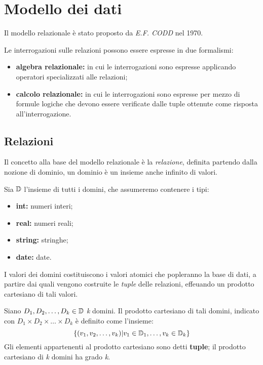 \section{Modello dei dati}%
\label{sec:Modello dei dati}
Il modello relazionale è stato proposto da \emph{E.F. CODD} nel 1970.

Le interrogazioni sulle relazioni possono essere espresse in due formalismi:
\begin{itemize}
  \item \textbf{algebra relazionale:} in cui le interrogazioni sono espresse
    applicando operatori specializzati alle relazioni;
  \item \textbf{calcolo relazionale:} in cui le interrogazioni sono espresse per
    mezzo di formule logiche che devono essere verificate dalle tuple ottenute
    come risposta all'interrogazione.
\end{itemize}

\subsection{Relazioni}%
\label{sub:Relazioni}
Il concetto alla base del modello relazionale è la \textit{relazione}, definita
partendo dalla nozione di dominio, un dominio è un insieme anche infinito di
valori.

Sia $\mathbb{D}$ l'insieme di tutti i domini, che assumeremo contenere i tipi:
\begin{itemize}
  \item \textbf{int:} numeri interi;
  \item \textbf{real:} numeri reali;
  \item \textbf{string:} stringhe;
  \item \textbf{date:} date.
\end{itemize}

I valori dei domini costituiscono i valori atomici che popleranno la base di
dati, a partire dai quali vengono costruite le \emph{tuple} delle relazioni,
effeuando un prodotto cartesiano di tali valori.

\begin{definizione}
Siano $D_1,D_2,\dots,D_k\in\mathbb{D}$ \emph{k} domini.
Il prodotto cartesiano di tali domini, indicato con $D_1\times
D_2\times\dots\times D_k$ è definito come l'insieme:
\[
  \{(v_1,v_2,\dots,v_k)|v_1\in\mathbb{D}_1,\dots,v_k\in\mathbb{D}_k\}
\]
Gli elementi appartenenti al prodotto cartesiano sono detti \textbf{tuple}; il
prodotto cartesiano di \emph{k} domini ha grado \emph{k}.
\end{definizione}

